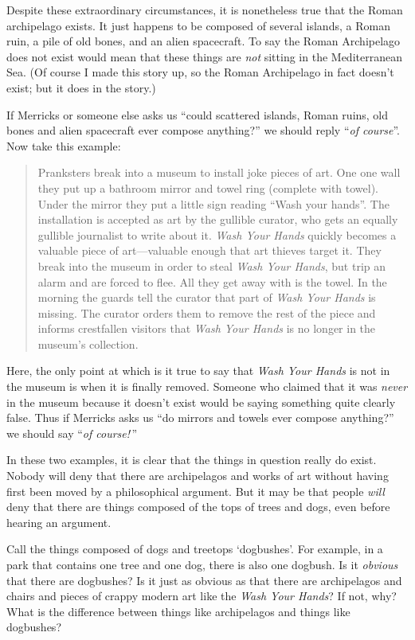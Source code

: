 \documentclass[11pt]{article}
\begin{document}
\begin{spacing}{1.25}
Despite these extraordinary circumstances, it is nonetheless true that
the Roman archipelago exists.  It just happens to be composed of
several islands, a Roman ruin, a pile of old bones, and an alien
spacecraft.  To say the Roman Archipelago does not exist would mean
that these things are {\em not} sitting in the Mediterranean Sea.  (Of
course I made this story up, so the Roman Archipelago in fact doesn't
exist; but it does in the story.)

If Merricks or someone else asks us ``could scattered islands, Roman
ruins, old bones and alien spacecraft ever compose anything?'' we
should reply ``{\em of course}''.  Now take this example:

\begin{quote}
Pranksters break into a museum to install joke pieces of art.  One one
wall they put up a bathroom mirror and towel ring (complete with
towel).  Under the mirror they put a little sign reading ``Wash your
hands''.  The installation is accepted as art by the gullible curator,
who gets an equally gullible journalist to write about it.  {\em Wash
  Your Hands} quickly becomes a valuable piece of art---valuable
enough that art thieves target it.  They break into the museum in
order to steal {\em Wash Your Hands}, but trip an alarm and are forced
to flee.  All they get away with is the towel.  In the morning the
guards tell the curator that part of {\em Wash Your Hands} is missing.
The curator orders them to remove the rest of the piece and informs
crestfallen visitors that {\em Wash Your Hands} is no longer in the
museum's collection.
\end{quote}

Here, the only point at which is it true to say that {\em Wash Your
  Hands} is not in the museum is when it is finally removed.  Someone
who claimed that it was {\em never} in the museum because it doesn't
exist would be saying something quite clearly false.  Thus if Merricks
asks us ``do mirrors and towels ever compose anything?'' we should say
``{\em of course!}\,''

In these two examples, it is clear that the things in question really
do exist.  Nobody will deny that there are archipelagos and works of
art without having first been moved by a philosophical argument.  But
it may be that people {\em will} deny that there are things composed
of the tops of trees and dogs, even before hearing an argument.

Call the things composed of dogs and treetops `dogbushes'.  For
example, in a park that contains one tree and one dog, there is also
one dogbush.  Is it {\em obvious} that there are dogbushes?  Is it
just as obvious as that there are archipelagos and chairs and pieces
of crappy modern art like the {\em Wash Your Hands}?  If not, why?
What is the difference between things like archipelagos and things
like dogbushes?


\end{spacing}
\end{document}
